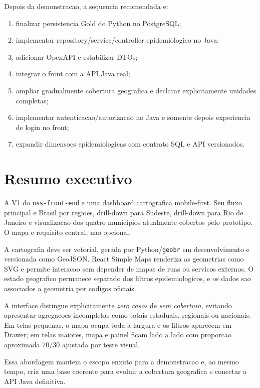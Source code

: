 \documentclass[12pt,a4paper]{article}
\begin{document}
Depois da demonstracao, a sequencia recomendada e:

\begin{enumerate}[leftmargin=*]
    \item finalizar persistencia Gold do Python no PostgreSQL;
    \item implementar repository/service/controller epidemiologico no Java;
    \item adicionar OpenAPI e estabilizar DTOs;
    \item integrar o front com a API Java real;
    \item ampliar gradualmente cobertura geografica e declarar explicitamente unidades completas;
    \item implementar autenticacao/autorizacao no Java e somente depois experiencia de login no front;
    \item expandir dimensoes epidemiologicas com contrato SQL e API versionados.
\end{enumerate}

\section{Resumo executivo}

A V1 do \texttt{nss-front-end} e uma dashboard cartografica mobile-first. Seu fluxo principal e Brasil por regioes, drill-down para Sudeste, drill-down para Rio de Janeiro e visualizacao dos quatro municipios atualmente cobertos pelo prototipo. O mapa e requisito central, nao opcional.

A cartografia deve ser vetorial, gerada por Python/\texttt{geobr} em desenvolvimento e versionada como GeoJSON. React Simple Maps renderiza as geometrias como SVG e permite interacao sem depender de mapas de ruas ou servicos externos. O estado geografico permanece separado dos filtros epidemiologicos, e os dados sao associados a geometria por codigos oficiais.

A interface distingue explicitamente \textit{zero casos} de \textit{sem cobertura}, evitando apresentar agregacoes incompletas como totais estaduais, regionais ou nacionais. Em telas pequenas, o mapa ocupa toda a largura e os filtros aparecem em Drawer; em telas maiores, mapa e painel ficam lado a lado com proporcao aproximada 70/30 ajustada por teste visual.

Essa abordagem mantem o escopo enxuto para a demonstracao e, ao mesmo tempo, cria uma base coerente para evoluir a cobertura geografica e conectar a API Java definitiva.
\end{document}
